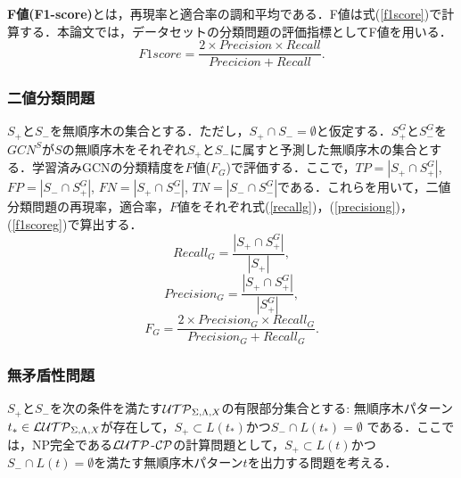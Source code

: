 \textbf{F値(F1-score)}とは，再現率と適合率の調和平均である．F値は式(\ref{f1score})で計算する．本論文では，データセットの分類問題の評価指標としてF値を用いる．
\begin{equation}
  \label{f1score}
  F1 score=\frac{2\times Precision\times Recall}{Precicion+Recall}.
\end{equation}


\subsubsection{二値分類問題}\label{subsec4.3.1}
$S_+$と$S_-$を無順序木の集合とする．ただし，$S_+\cap S_-=\emptyset$と仮定する．$S_+^G$と$S_-^G$を$GCN^S$が$S$の無順序木をそれぞれ$S_+$と$S_-$に属すと予測した無順序木の集合とする．学習済みGCNの分類精度を$F$値($F_G$)で評価する．ここで，$TP=|S_+\cap S_+^G|$, $FP=|S_-\cap S_+^G|$, $FN=|S_+\cap S_-^G|$, $TN=|S_-\cap S_-^G|$である．これらを用いて，二値分類問題の再現率，適合率，$F$値をそれぞれ式(\ref{recallg})，(\ref{precisiong})，(\ref{f1scoreg})で算出する．
\begin{equation}
  \label{recallg}
  Recall_G=\frac{|S_+\cap S_+^G|}{|S_+|},
\end{equation}
\begin{equation}
  \label{precisiong}
  Precision_G=\frac{|S_+\cap S_+^G|}{|S_+^G|},
\end{equation}
\begin{equation}
  \label{f1scoreg}
  F_G=\frac{2\times Precision_G\times Recall_G}{Precision_G+Recall_G}.
\end{equation}


\subsubsection{無矛盾性問題}\label{subsec4.3.2}
$S_+$と$S_-$を次の条件を満たす${\cal UTP}_{\Sigma,\Lambda,X}$の有限部分集合とする:
無順序木パターン$t_{\ast}\in {\cal LUTP}_{\Sigma,\Lambda,X}$が存在して，$S_+\subset L(t_{\ast})$かつ$S_-\cap L(t_{\ast})=\emptyset$ である．ここでは，NP完全である${\cal LUTP}$-${\cal CP}$の計算問題として，$S_+\subset L(t)$かつ$S_-\cap L(t)=\emptyset$を満たす無順序木パターン$t$を出力する問題を考える．

